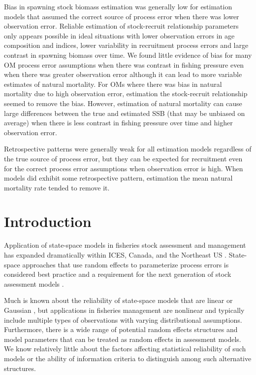 \documentclass[
  12pt,
]{article}
\begin{document}
Bias in spawning stock biomass estimation was generally low for
estimation models that assumed the correct source of process error when
there was lower observation error. Reliable estimation of stock-recruit
relationship parameters only appears possible in ideal situations with
lower observation errors in age composition and indices, lower
variability in recruitment process errors and large contrast in spawning
biomass over time. We found little evidence of bias for many OM process
error assumptions when there was contrast in fishing pressure even when
there was greater observation error although it can lead to more
variable estimates of natural mortality. For OMs where there was bias in
natural mortality due to high observation error, estimation the
stock-recruit relationship seemed to remove the bias. However,
estimation of natural mortality can cause large differences between the
true and estimated SSB (that may be unbiased on average) when there is
less contrast in fishing pressure over time and higher observation
error.

Retrospective patterns were generally weak for all estimation models
regardless of the true source of process error, but they can be expected
for recruitment even for the correct process error assumptions when
observation error is high. When models did exhibit some retrospective
pattern, estimation the mean natural mortality rate tended to remove it.

\pagebreak

\hypertarget{introduction}{%
\section*{Introduction}\label{introduction}}

Application of state-space models in fisheries stock assessment and
management has expanded dramatically within ICES, Canada, and the
Northeast US \citep{nielsenberg14,cadigan16,stockmiller21}. State-space
approaches that use random effects to parameterize process errors is
considered best practice and a requirement for the next generation of
stock assessment models \citep{hoyleetal22, punt23}.

Much is known about the reliability of state-space models that are
linear or Gaussian \citep{aeberhardetal18}, but applications in
fisheries management are nonlinear and typically include multiple types
of observations with varying distributional assumptions. Furthermore,
there is a wide range of potential random effects structures and model
parameters that can be treated as random effects in assessment models.
We know relatively little about the factors affecting statistical
reliability of such models or the ability of information criteria to
distinguish among such alternative structures.
\end{document}

